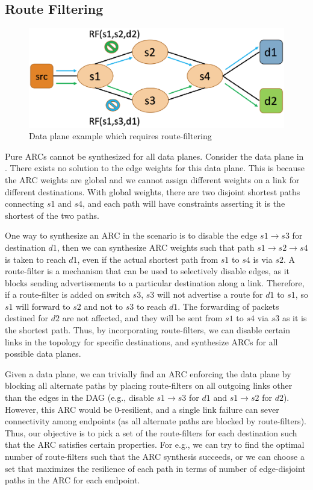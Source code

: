 \subsection{Route Filtering} \label{sec:routefilter}
\begin{figure}[h!] 
	\centering
	\includegraphics[width=0.8\columnwidth]{figures/diamond.eps}
	\caption{Data plane example which requires route-filtering} \label{fig:diamond}
\end{figure}
Pure ARCs cannot be synthesized for all data planes. Consider the data
plane in . 
There exists no solution to the edge weights for this data plane. 
This is because the ARC weights are global and we cannot
assign different weights on a link for different destinations.  
With global weights, there are two disjoint shortest paths connecting 
$s1$ and $s4$, and each path will have 
constraints
asserting it is the shortest of the two paths. 

One way to synthesize an ARC in the scenario 
is to disable the edge
$s1 \rightarrow s3$ for destination $d1$, 
then we can synthesize ARC weights
such that path $s1 \rightarrow s2 \rightarrow s4$
 is taken to reach $d1$, 
even if the actual shortest path
from $s1$ to $s4$ is via $s2$. 
A route-filter is a mechanism 
that can be used to selectively disable
edges, as it blocks sending advertisements to a
particular destination along a link. 
Therefore, if a route-filter is added on switch $s3$, 
$s3$ 
will not advertise a route for $d1$ to $s1$, so 
$s1$ will forward to $s2$ and not to $s3$
to reach $d1$. The forwarding of packets destined
for $d2$ are not affected, and they will be sent from
$s1$ to $s4$ via $s3$ as it is the shortest path.
Thus, by incorporating route-filters, we can
disable certain links in the topology 
for specific destinations, and synthesize
ARCs for all possible data planes. 

Given a data plane, we can trivially find an 
ARC enforcing the data plane by blocking all alternate
paths by placing 
route-filters on all outgoing links other than the edges
in the DAG (e.g., disable $s1 \rightarrow s3$ for $d1$
and $s1 \rightarrow s2$ for $d2$). However, this 
ARC would be
0-resilient, and a single link failure can sever 
connectivity among endpoints (as all alternate paths
are blocked by route-filters). Thus, our objective is
to pick a set of the route-filters for each destination
such that the 
ARC satisfies certain properties. For e.g., we can
try to find the optimal number of route-filters such 
that the ARC synthesis succeeds, or we can choose a
set that maximizes the resilience of each path 
in terms of number of edge-disjoint paths in the ARC
for each endpoint. 


